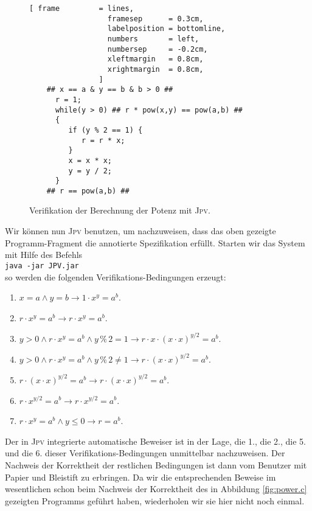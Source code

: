 \begin{figure}[!ht]
\centering
\begin{Verbatim}[ frame         = lines, 
                  framesep      = 0.3cm, 
                  labelposition = bottomline,
                  numbers       = left,
                  numbersep     = -0.2cm,
                  xleftmargin   = 0.8cm,
                  xrightmargin  = 0.8cm,
                ]
    ## x == a & y == b & b > 0 ##
      r = 1;
      while(y > 0) ## r * pow(x,y) == pow(a,b) ##
      {
         if (y % 2 == 1) {
            r = r * x;  
         }
         x = x * x;
         y = y / 2;
      }
    ## r == pow(a,b) ##
\end{Verbatim}
\vspace*{-0.3cm}
\caption{Verifikation der Berechnung der Potenz mit \textsc{Jpv}.}
\label{fig:Power.ver}
\end{figure}

Wir k\"onnen nun \textsc{Jpv} benutzen, um nachzuweisen, dass das oben gezeigte
Programm-Fragment die annotierte Spezifikation erf\"ullt.  Starten wir das System mit Hilfe
des Befehls
\\[0.2cm]
\hspace*{1.3cm}
\texttt{java -jar JPV.jar}
\\[0.2cm]
so werden die folgenden Verifi\-kations-Bedingungen erzeugt:
\begin{enumerate}
\item $x = a \wedge y = b \rightarrow 1 \cdot x^y = a^b$.
\item $r \cdot x^y = a^b \rightarrow r \cdot x^y = a^b$.
\item $y > 0 \wedge r \cdot x^y = a^b \wedge y \,\texttt{\%}\, 2 = 1 \rightarrow
        r \cdot x \cdot (x \cdot x)^{y / 2} = a^b$.
\item $y > 0 \wedge r \cdot x^y = a^b \wedge y \,\texttt{\%}\, 2 \not= 1    \rightarrow
        r \cdot (x \cdot x)^{y / 2} = a^b$.
\item $r \cdot (x \cdot x)^{y / 2} = a^b \rightarrow r \cdot (x \cdot x)^{y / 2} = a^b$.
\item $r \cdot x^{y / 2} = a^b    \rightarrow r \cdot x^{y / 2} = a^b$.
\item $r \cdot x^y = a^b \wedge y \leq 0    \rightarrow r = a^b$.
\end{enumerate}
Der in \textsc{Jpv} integrierte automatische Beweiser ist in der Lage, die 1., die 2., die
5. und die 6. dieser Verifikations-Bedingungen unmittelbar nachzuweisen.  Der Nachweis der
Korrektheit der restlichen Bedingungen ist dann vom Benutzer mit Papier und Bleistift zu erbringen.
Da wir die entsprechenden Beweise im wesentlichen schon beim Nachweis der Korrektheit des in
Abbildung \ref{fig:power.c} gezeigten Programms gef\"uhrt haben, wiederholen wir sie hier
nicht noch einmal.


